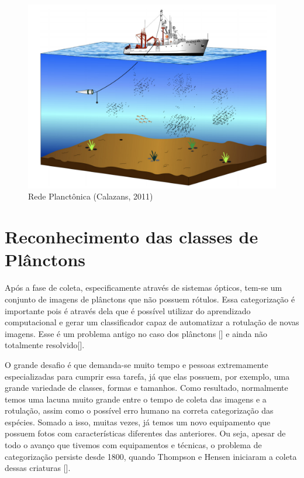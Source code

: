 \begin{figure}
  \centering
  \includegraphics[width=.8\textwidth]{figures/amostragem_planctons.png}
  \caption{Rede Planctônica (Calazans, 2011)}
  \label{fig:amostragem_planctons}
\end{figure}



\section{Reconhecimento das classes de Plânctons}
\label{sec:reconhecimento_planctons}


Após a fase de coleta, especificamente através de sistemas ópticos, tem-se um conjunto de imagens de plânctons que não possuem rótulos. Essa categorização é importante pois é através dela que é possível utilizar do aprendizado computacional e gerar um classificador capaz de automatizar a rotulação de novas imagens. Esse é um problema antigo no caso dos plânctons [\cite{jeffries1980computer, jeffries1984automated, berman1990image, tang1998automatic}]   e ainda não totalmente resolvido[\cite{luo2003learning, davis2004real, grosjean2004enumeration, luo2005active, hu2005automatic, blaschko2005automatic, hu2006accurate, sosik2007automated, bell2008assessment, soh2008segmentation, al2016plankton, luo2017automated, al2018intelligent}].

O grande desafio é que demanda-se muito tempo e pessoas extremamente especializadas para cumprir essa tarefa, já que elas possuem, por exemplo, uma grande variedade de classes, formas e tamanhos. Como resultado, normalmente temos uma lacuna muito grande entre o tempo de coleta das imagens e a rotulação, assim como o possível erro humano na correta categorização das espécies. Somado a isso, muitas vezes, já temos um novo equipamento que possuem fotos com características diferentes das anteriores. Ou seja, apesar de todo o avanço que tivemos com equipamentos e técnicas, o problema de categorização persiste desde 1800, quando Thompson e Hensen iniciaram a coleta dessas criaturas [\cite{brierleyplankton, benfield2007rapid}]. 

